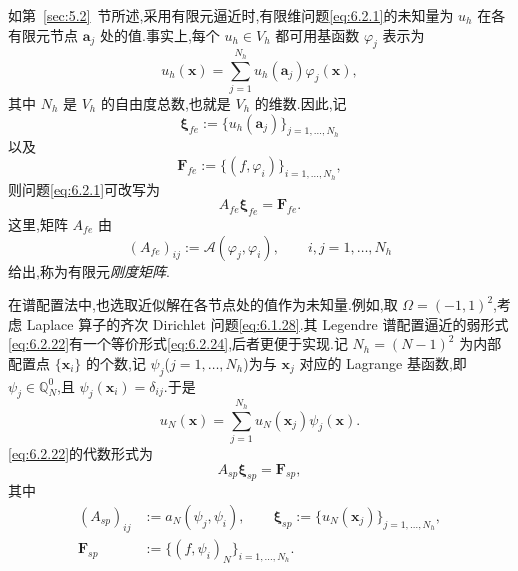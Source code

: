 如第~\ref{sec:5.2}~节所述,采用有限元逼近时,有限维问题\eqref{eq:6.2.1}的未知量为 \(u_h\) 在各有限元节点 \(\boldsymbol{a}_j\) 处的值.事实上,每个 \(u_h\in V_h\) 都可用基函数 \(\varphi_j\) 表示为
\begin{equation}\label{eq:6.3.1}
  u_h(\boldsymbol{x})=\sum_{j=1}^{N_h}u_h(\boldsymbol{a}_j)\varphi_j(\boldsymbol{x}),
\end{equation}
其中 \(N_h\) 是 \(V_h\) 的自由度总数,也就是 \(V_h\) 的维数.因此,记
\begin{equation}\label{eq:6.3.2}
  \boldsymbol{\xi}_{fe}:=\{u_h(\boldsymbol{a}_j)\}_{j=1,\ldots,N_h}
\end{equation}
以及
\begin{equation}\label{eq:6.3.3}
  \boldsymbol{F}_{fe}:=\{(f,\varphi_i)\}_{i=1,\ldots,N_h},
\end{equation}
则问题\eqref{eq:6.2.1}可改写为
\begin{equation}\label{eq:6.3.4}
  A_{fe}\boldsymbol{\xi}_{fe}=\boldsymbol{F}_{fe}.
\end{equation}
这里,矩阵 \(A_{fe}\) 由
\begin{equation}\label{eq:6.3.5}
  (A_{fe})_{ij}:=\mathcal A(\varphi_j,\varphi_i),\qquad i,j=1,\ldots,N_h
\end{equation}
给出,称为有限元\emph{刚度矩阵}.

在谱配置法中,也选取近似解在各节点处的值作为未知量.例如,取 \(\Omega=(-1,1)^2\),考虑 Laplace 算子的齐次 Dirichlet 问题\eqref{eq:6.1.28}.其 Legendre 谱配置逼近的弱形式\eqref{eq:6.2.22}有一个等价形式\eqref{eq:6.2.24},后者更便于实现.记 \(N_h=(N-1)^2\) 为内部配置点 \(\{\boldsymbol{x}_i\}\) 的个数,记 \(\psi_j\)(\(j=1,\ldots,N_h\))为与 \(\boldsymbol{x}_j\) 对应的 Lagrange 基函数,即 \(\psi_j\in\mathbb Q_N^0\),且 \(\psi_j(\boldsymbol{x}_i)=\delta_{ij}\).于是
\[
  u_N(\boldsymbol{x})=\sum_{j=1}^{N_h}u_N(\boldsymbol{x}_j)\psi_j(\boldsymbol{x}).
\]
\eqref{eq:6.2.22}的代数形式为
\begin{equation}\label{eq:6.3.6}
  A_{sp}\boldsymbol{\xi}_{sp}=\boldsymbol{F}_{sp},
\end{equation}
其中
\begin{equation}\label{eq:6.3.7}
  \begin{aligned}
    (A_{sp})_{ij}&:=a_N(\psi_j,\psi_i),\qquad
    \boldsymbol{\xi}_{sp}:=\{u_N(\boldsymbol{x}_j)\}_{j=1,\ldots,N_h},\\
    \boldsymbol{F}_{sp}&:=\{(f,\psi_i)_N\}_{i=1,\ldots,N_h}.
  \end{aligned}
\end{equation}

